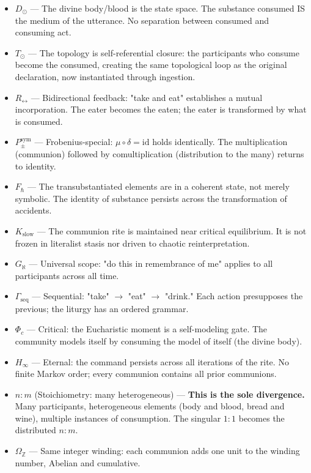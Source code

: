 \documentclass[12pt,a4paper]{article}
\begin{document}
\begin{itemize}
    \item \textbf{$D_{\odot}$} --- The divine body/blood is the state space. The substance consumed IS the medium of the utterance. No separation between consumed and consuming act.
    \item \textbf{$T_{\odot}$} --- The topology is self-referential closure: the participants who consume become the consumed, creating the same topological loop as the original declaration, now instantiated through ingestion.
    \item \textbf{$R_{\leftrightarrow}$} --- Bidirectional feedback: "take and eat" establishes a mutual incorporation. The eater becomes the eaten; the eater is transformed by what is consumed.
    \item \textbf{$P_{\pm}^{\text{sym}}$} --- Frobenius-special: $\mu \circ \delta = \text{id}$ holds identically. The multiplication (communion) followed by comultiplication (distribution to the many) returns to identity.
    \item \textbf{$F_{\hbar}$} --- The transubstantiated elements are in a coherent state, not merely symbolic. The identity of substance persists across the transformation of accidents.
    \item \textbf{$K_{\text{slow}}$} --- The communion rite is maintained near critical equilibrium. It is not frozen in literalist stasis nor driven to chaotic reinterpretation.
    \item \textbf{$G_{\aleph}$} --- Universal scope: "do this in remembrance of me" applies to all participants across all time.
    \item \textbf{$\Gamma_{\text{seq}}$} --- Sequential: "take" $\rightarrow$ "eat" $\rightarrow$ "drink." Each action presupposes the previous; the liturgy has an ordered grammar.
    \item \textbf{$\Phi_c$} --- Critical: the Eucharistic moment is a self-modeling gate. The community models itself by consuming the model of itself (the divine body).
    \item \textbf{$H_{\infty}$} --- Eternal: the command persists across all iterations of the rite. No finite Markov order; every communion contains all prior communions.
    \item \textbf{$n{:}m$} (Stoichiometry: many heterogeneous) --- \textbf{This is the sole divergence.} Many participants, heterogeneous elements (body and blood, bread and wine), multiple instances of consumption. The singular $1{:}1$ becomes the distributed $n{:}m$.
    \item \textbf{$\Omega_\mathbb{Z}$} --- Same integer winding: each communion adds one unit to the winding number, Abelian and cumulative.
\end{itemize}
\end{document}
